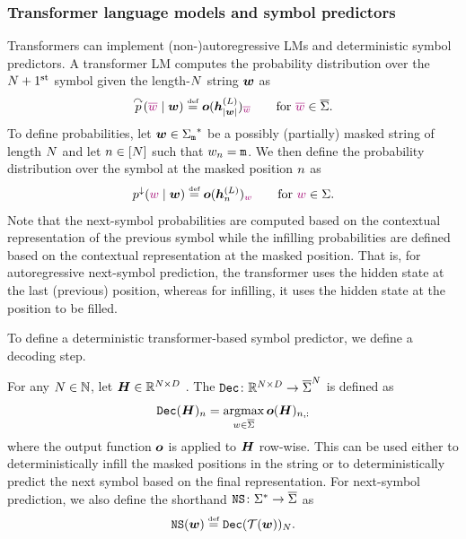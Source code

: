 \subsubsection{Transformer language models and symbol predictors} \label{app:language-models-and-next-symbol-predictors}
Transformers can implement (non-)autoregressive LMs and deterministic symbol predictors. 
A transformer LM computes the probability distribution over the ${{N}} + 1\textsuperscript{st}$ symbol given the length-${{N}}$ string ${{\boldsymbol{w}}}$ as
\begin{equation}
   \pLMFun{\textcolor{ETHPurple}{\eossym} \mid \str} \defeq \transoutput(\hiddState^{(\numlayers)}_{|\str|})_{\textcolor{ETHPurple}{\eossym}} \qquad \text{for } \textcolor{ETHPurple}{\eossym} \in \eosalphabet.
\end{equation}
To define  probabilities, let ${{\boldsymbol{w}}} \in {{{{{\Sigma}}_{{\texttt{m}}}}^{*}}}$ be a possibly (partially) masked string of length ${{N}}$ and let ${{n}} \in {\left[ {{N}}\right]}$ such that ${{w}}_{{n}} = {\texttt{m}}$.
We then define the probability distribution over the symbol at the masked position ${{n}}$ as
\begin{equation}
   \pLMInfFun{\textcolor{ETHPurple}{\sym} \mid \str} \defeq \transoutput(\hiddState^{(\numlayers)}_{\stridx})_{\textcolor{ETHPurple}{\sym}} \qquad \text{for } \textcolor{ETHPurple}{\sym} \in \alphabet.
\end{equation}
Note that the next-symbol probabilities are computed based on the contextual representation of the previous symbol while the infilling probabilities are defined based on the contextual representation at the masked position.
That is, for autoregressive next-symbol prediction, the transformer uses the hidden state at the last (previous) position, whereas for infilling, it uses the hidden state at the position to be filled. 

To define a deterministic transformer-based symbol predictor, we define a decoding step.
\begin{definition} \label{def:decoding-step}
   For any ${{N}} \in {{\mathbb{N}}}$, let ${{{{{{{\bm{H}}}}}}}} \in {{\mathbb{R}}}^{{{N}} \times {{D}}}$ .
   The  ${{\texttt{Dec}}}\colon {{\mathbb{R}}}^{{{N}} \times {{D}}} \to {{\overline{{{\Sigma}}}}}^{{{N}}}$ is defined as
   \begin{equation}
      {{\texttt{Dec}}}({{{{{{{\bm{H}}}}}}}})_{{n}} = \operatorname*{{{argmax}}}_{{{w}} \in {{\overline{{{\Sigma}}}}}} {\bm{o}}({{{{{{{\bm{H}}}}}}}})_{{{n}}, :}
   \end{equation}
   where the output function ${\bm{o}}$ is applied to ${{{{{{{\bm{H}}}}}}}}$ row-wise.
   This can be used either to deterministically infill the masked positions in the string or to deterministically predict the next symbol based on the final representation.
   For next-symbol prediction, we also define the shorthand ${{\texttt{NS}}} \colon {{{{{{\Sigma}}^{*}}}}} \to {{\overline{{{\Sigma}}}}}$ as
   \begin{equation}
      \decoderFun{\str} \defeq \decodeStep(\tf(\str))_{\strlen}.
   \end{equation}
\end{definition}

